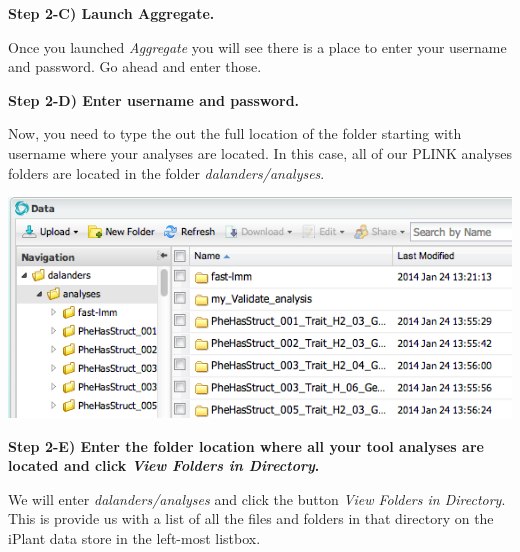 \documentclass[twoside,a4paper]{refart}
\begin{document}
\textbf{Step 2-C) Launch Aggregate.}  

Once you launched \textit{Aggregate} you will see there is a place to enter your username and password. Go ahead and enter those. 

\textbf{Step 2-D) Enter username and password.}

Now, you need to type the out the full location of the folder starting with username where your analyses are located. In this case, all of our PLINK analyses folders are located in the folder \textit{dalanders/analyses}.

\includegraphics[width=\textwidth]{doc_step2_2}

\textbf{Step 2-E) Enter the folder location where all your tool analyses are located and click \textit{View Folders in Directory}.}

We will enter \textit{dalanders/analyses} and click the button \textit{View Folders in Directory}. This is provide us with a list of all the files and folders in that directory on the iPlant data store in the left-most listbox.
\vspace{-1mm}
\begin{center}
\end{center}
\end{document}
